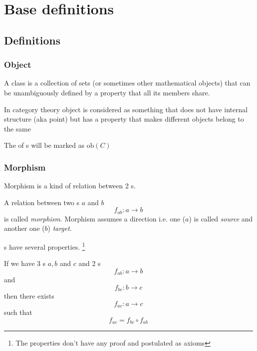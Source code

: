 \chapter{Base definitions}

\section{Definitions}

\subsection{Object}

\begin{definition}[Class]
  A class is a collection of sets (or sometimes other mathematical
  objects) that can be unambiguously defined by a property that all
  its members share. 
  \label{def:class}
\end{definition}

\begin{definition}[Object]
\label{def:object}
In category theory object is considered as something that does not
have internal structure (aka point) but has a property that makes
different objects belong to the same 
\end{definition}

\begin{remark}
\label{rem:objclass}
The  of s will be marked as 
$\mathrm{ob}(C)$
\end{remark}

\subsection{Morphism}
Morphism is a kind of relation between 2 s. 
\begin{definition}[Morphism]
\label{def:morphism}
A relation between two s $a$ and $b$ 
\[
f_{ab}: a \rightarrow b
\]
is called
\textit{morphism}. Morphism assumes a direction i.e. one 
($a$) is called \textit{source} and another one ($b$) \textit{target}.
\end{definition}

s have several properties. \footnote{The
  properties don't have any proof and postulated as axioms}
\begin{property}[Composition]
\label{prop:composition}
If we have 3 s $a, b$ and $c$ and 2
s 
\[
f_{ab} : a \rightarrow b
\]
and 
\[
f_{bc} : b \rightarrow c
\]
then there exists  
\[
f_{ac} : a \rightarrow c
\]
such that
\[
f_{ac} = f_{bc} \circ f_{ab}
\]
\end{property}

